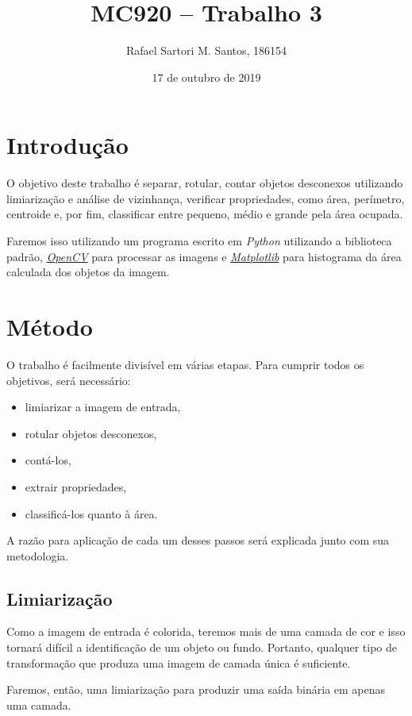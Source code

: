 \documentclass[brazilian,a4paper,twocolumn]{article}
\title{MC920 -- Trabalho 3}
\author{Rafael Sartori M. Santos, 186154}
\date{17 de outubro de 2019}
\begin{document}
\maketitle


\section{Introdução}

    O objetivo deste trabalho é separar, rotular, contar objetos desconexos utilizando limiarização e análise de vizinhança, verificar propriedades, como área, perímetro, centroide e, por fim, classificar entre pequeno, médio e grande pela área ocupada.

    Faremos isso utilizando um programa escrito em \emph{Python} utilizando a biblioteca padrão, \href{https://opencv.org/}{\emph{OpenCV}} para processar as imagens e \href{https://matplotlib.org/}{\emph{Matplotlib}} para histograma da área calculada dos objetos da imagem.


\section{Método}

    O trabalho é facilmente divisível em várias etapas. Para cumprir todos os objetivos, será necessário:
    \begin{itemize}
        \item limiarizar a imagem de entrada,
        \item rotular objetos desconexos,
        \item contá-los,
        \item extrair propriedades,
        \item classificá-los quanto à área.
    \end{itemize}

    A razão para aplicação de cada um desses passos será explicada junto com sua metodologia.

    \subsection{Limiarização}

        Como a imagem de entrada é colorida, teremos mais de uma camada de cor e isso tornará difícil a identificação de um objeto ou fundo. Portanto, qualquer tipo de transformação que produza uma imagem de camada única é suficiente.

        Faremos, então, uma limiarização para produzir uma saída binária em apenas uma camada.
\end{document}
